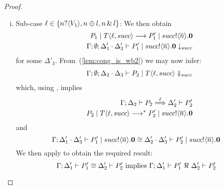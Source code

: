 \begin{proof}
\begin{enumerate}[1.]
			\begin{enumerate}[i.]
				\item	Sub-case $\ell \in \{n ? \langle V_1 \rangle, n \oplus l, n \,\&\, l\}$:  
				We then obtain
						\begin{eqnarray*}
							&& P_1 \;|\; T\langle \ell, succ \rangle \longrightarrow P_1' \;|\; succ ! \langle \overline{n} \rangle . \mathbf{0} \\
							&& \Gamma; \emptyset; \Delta_1' \cdot \Delta_3' \vdash P_1' \;|\; succ ! \langle \overline{n} \rangle . \mathbf{0} \downarrow_{succ}
						\end{eqnarray*}
						for some $\Delta'_3$. From~(\ref{lem:cong_is_wb2}) we may now infer:
						\begin{eqnarray*}
							&& \Gamma; \emptyset; \Delta_2 \cdot \Delta_3 \vdash P_2 \;|\; T\langle \ell, succ \rangle \Downarrow_{succ}
						\end{eqnarray*}
						which, using , implies
						\begin{eqnarray*}
							&& \Gamma; \Delta_2 \vdash P_2 \stackrel{\ell}{\Longrightarrow} \Delta_2' \vdash P_2'\\
							&& P_2 \;|\; T \langle \ell, succ \rangle \longrightarrow^{*} P_2' \;|\; succ ! \langle \overline{n} \rangle . \mathbf{0}
						\end{eqnarray*}
						\noi and
						\[
							\Gamma; \Delta_1' \cdot \Delta_3' \vdash P_1' \;|\; succ ! \langle \overline{n} \rangle .\mathbf{0} \cong \Delta_2' \cdot \Delta_3' \vdash P_2' \;|\; succ ! \langle \overline{n} \rangle . \mathbf{0}
						\]
						We then apply  to obtain the required result:
						\[
							\horel{\Gamma}{\Delta_1'}{P_1'}{\cong}{\Delta_2'}{P_2'} \text{ implies } \horel{\Gamma}{\Delta_1'}{P_1'}{\ \Re\ }{\Delta_2'}{P_2'}
						\]


\end{enumerate}
\end{enumerate}
\end{proof}
